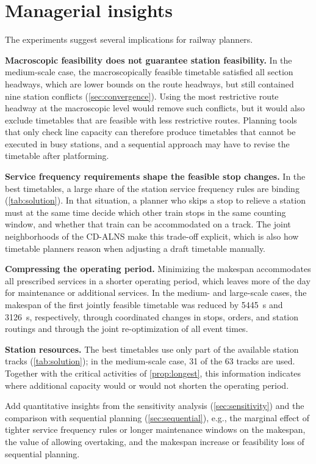 \section{Managerial insights}\label{sec:insights}
The experiments suggest several implications for railway planners.

\textbf{Macroscopic feasibility does not guarantee station feasibility.} In the medium-scale case, the macroscopically feasible timetable satisfied all section headways, which are lower bounds on the route headways, but still contained nine station conflicts (\cref{sec:convergence}). Using the most restrictive route headway at the macroscopic level would remove such conflicts, but it would also exclude timetables that are feasible with less restrictive routes. Planning tools that only check line capacity can therefore produce timetables that cannot be executed in busy stations, and a sequential approach may have to revise the timetable after platforming.

\textbf{Service frequency requirements shape the feasible stop changes.} In the best timetables, a large share of the station service frequency rules are binding (\cref{tab:solution}). In that situation, a planner who skips a stop to relieve a station must at the same time decide which other train stops in the same counting window, and whether that train can be accommodated on a track. The joint neighborhoods of the CD-ALNS make this trade-off explicit, which is also how timetable planners reason when adjusting a draft timetable manually.

\textbf{Compressing the operating period.} Minimizing the makespan accommodates all prescribed services in a shorter operating period, which leaves more of the day for maintenance or additional services. In the medium- and large-scale cases, the makespan of the first jointly feasible timetable was reduced by 5445~s and 3126~s, respectively, through coordinated changes in stops, orders, and station routings and through the joint re-optimization of all event times.

\textbf{Station resources.} The best timetables use only part of the available station tracks (\cref{tab:solution}); in the medium-scale case, 31 of the 63 tracks are used. Together with the critical activities of \cref{prop:longest}, this information indicates where additional capacity would or would not shorten the operating period.

\begin{pending}
Add quantitative insights from the sensitivity analysis (\cref{sec:sensitivity}) and the comparison with sequential planning (\cref{sec:sequential}), e.g., the marginal effect of tighter service frequency rules or longer maintenance windows on the makespan, the value of allowing overtaking, and the makespan increase or feasibility loss of sequential planning.
\end{pending}
